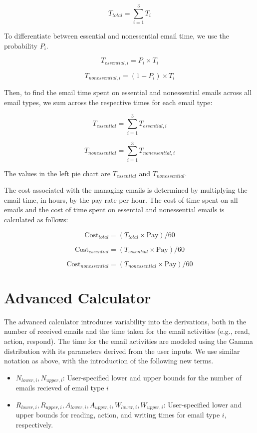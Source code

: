\documentclass[
  reportpaper,
  DIV=11,
  numbers=noendperiod]{scrartcl}
\providecommand{\tightlist}{%
  \setlength{\itemsep}{0pt}\setlength{\parskip}{0pt}}\usepackage{longtable,booktabs,array}
\begin{document}
\[ T_{total} = \sum_{i=1}^{3} T_i \]

To differentiate between essential and nonessential email time, we use
the probability \(P_i\).

\[ T_{essential,i} = P_i \times T_i \]

\[ T_{nonessential,i} = (1 - P_i) \times T_i \]

Then, to find the email time spent on essential and nonessential emails
across all email types, we sum across the respective times for each
email type:

\[ T_{essential} = \sum_{i=1}^{3} T_{essential,i} \]

\[ T_{nonessential} = \sum_{i=1}^{3} T_{nonessential,i} \]

The values in the left pie chart are \(T_{essential}\) and
\(T_{nonessential}\).

The cost associated with the managing emails is determined by
multiplying the email time, in hours, by the pay rate per hour. The cost
of time spent on all emails and the cost of time spent on essential and
nonessential emails is calculated as follows:

\[ \text{Cost}_{total} = ( T_{total} \times \text{Pay} ) / 60\]

\[ \text{Cost}_{essential} = ( T_{essential} \times \text{Pay}  ) / 60\]

\[ \text{Cost}_{nonessential} = ( T_{nonessential} \times \text{Pay}  ) / 60\]

\newpage{}

\section{Advanced Calculator}\label{advanced-calculator}

The advanced calculator introduces variability into the derivations,
both in the number of received emails and the time taken for the email
activities (e.g., read, action, respond). The time for the email
activities are modeled using the Gamma distribution with its parameters
derived from the user inputs. We use similar notation as above, with the
introduction of the following new terms.

\begin{itemize}
\tightlist
\item
  \(N_{lower,i}, N_{upper,i}\): User-specified lower and upper bounds
  for the number of emails recieved of email type \(i\)
\item
  \(R_{lower,i}, R_{upper,i}, A_{lower,i}, A_{upper,i}, W_{lower,i}, W_{upper,i}\):
  User-specified lower and upper bounds for reading, action, and writing
  times for email type \(i\), respectively.
\end{itemize}
\end{document}
